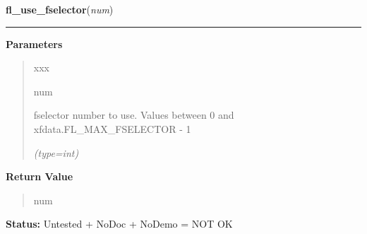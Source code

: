     \label{xformslib:flgoodies:fl_use_fselector}

    \vspace{0.5ex}

\hspace{.8\funcindent}\begin{boxedminipage}{\funcwidth}

    \raggedright \textbf{fl\_use\_fselector}(\textit{num})

    \vspace{-1.5ex}

    \rule{\textwidth}{0.5\fboxrule}
\setlength{\parskip}{2ex}
\setlength{\parskip}{1ex}
      \textbf{Parameters}
      \vspace{-1ex}

      \begin{quote}
        \begin{Ventry}{xxx}

          \item[num]

          fselector number to use. Values between 0 and 
          xfdata.FL\_MAX\_FSELECTOR - 1

            {\it (type=int)}

        \end{Ventry}

      \end{quote}

      \textbf{Return Value}
    \vspace{-1ex}

      \begin{quote}
      num

      \end{quote}

\textbf{Status:} Untested + NoDoc + NoDemo = NOT OK



    \end{boxedminipage}

    \label{xformslib:flgoodies:fl_show_fselector}

    \vspace{0.5ex}

